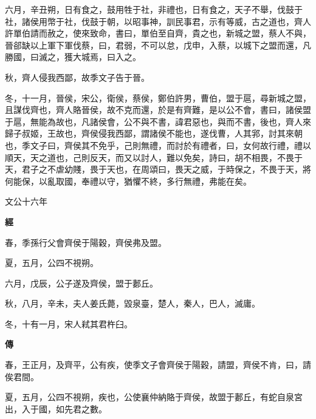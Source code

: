 \documentclass{ctexart}
\begin{document}
六月，辛丑朔，日有食之，鼓用牲于社，非禮也，日有食之，天子不舉，伐鼓于社，諸侯用幣于社，伐鼓于朝，以昭事神，訓民事君，示有等威，古之道也，齊人許單伯請而赦之，使來致命，書曰，單伯至自齊，貴之也，新城之盟，蔡人不與，晉郤缺以上軍下軍伐蔡，曰，君弱，不可以怠，戊申，入蔡，以城下之盟而還，凡勝國，曰滅之，獲大城焉，曰入之。

秋，齊人侵我西鄙，故季文子告于晉。

冬，十一月，晉侯，宋公，衛侯，蔡侯，鄭伯許男，曹伯，盟于扈，尋新城之盟，且謀伐齊也，齊人賂晉侯，故不克而還，於是有齊難，是以公不會，書曰，諸侯盟于扈，無能為故也，凡諸侯會，公不與不書，諱君惡也，與而不書，後也，齊人來歸子叔姬，王故也，齊侯侵我西鄙，謂諸侯不能也，遂伐曹，人其郛，討其來朝也，季文子曰，齊侯其不免乎，己則無禮，而討於有禮者，曰，女何故行禮，禮以順天，天之道也，己則反天，而又以討人，難以免矣，詩曰，胡不相畏，不畏于天，君子之不虐幼賤，畏于天也，在周頌曰，畏天之威，于時保之，不畏于天，將何能保，以亂取國，奉禮以守，猶懼不終，多行無禮，弗能在矣。





文公十六年


\textbf{經}



春，季孫行父會齊侯于陽穀，齊侯弗及盟。

夏，五月，公四不視朔。

六月，戊辰，公子遂及齊侯，盟于郪丘。

秋，八月，辛未，夫人姜氏薨，毀泉臺，楚人，秦人，巴人，滅庸。

冬，十有一月，宋人弒其君杵臼。

\textbf{傳}



春，王正月，及齊平，公有疾，使季文子會齊侯于陽穀，請盟，齊侯不肯，曰，請俟君間。

夏，五月，公四不視朔，疾也，公使襄仲納賂于齊侯，故盟于郪丘，有蛇自泉宮出，入于國，如先君之數。
\end{document}

